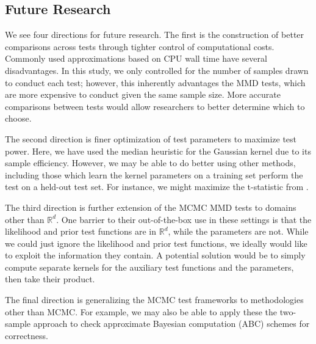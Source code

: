 \documentclass[a4paper,11pt]{article}
\begin{document}
\subsection{Future Research}
We see four directions for future research. The first is the construction of better comparisons across tests through tighter control of computational costs. Commonly used approximations based on CPU wall time have several disadvantages. In this study, we only controlled for the number of samples drawn to conduct each test; however, this inherently advantages the MMD tests, which are more expensive to conduct given the same sample size. More accurate comparisons between tests would allow researchers to better determine which to choose.

The second direction is finer optimization of test parameters to maximize test power. Here, we have used the median heuristic for the Gaussian kernel due to its sample efficiency. However, we may be able to do better using other methods, including those which learn the kernel parameters on a training set perform the test on a held-out test set. For instance, we might maximize the t-statistic from \cite{sutherland_generative_2019}.

The third direction is further extension of the MCMC MMD tests to domains other than $\mathbb{R}^{d}$. One barrier to their out-of-the-box use in these settings is that the likelihood and prior test functions are in $\mathbb{R}^{d}$, while the parameters are not. While we could just ignore the likelihood and prior test functions, we ideally would like to exploit the information they contain. A potential solution would be to simply compute separate kernels for the auxiliary test functions and the parameters, then take their product.

The final direction is generalizing the MCMC test frameworks to methodologies other than MCMC. For example, we may also be able to apply these the two-sample approach to check approximate Bayesian computation (ABC) schemes for correctness.



\end{document}

